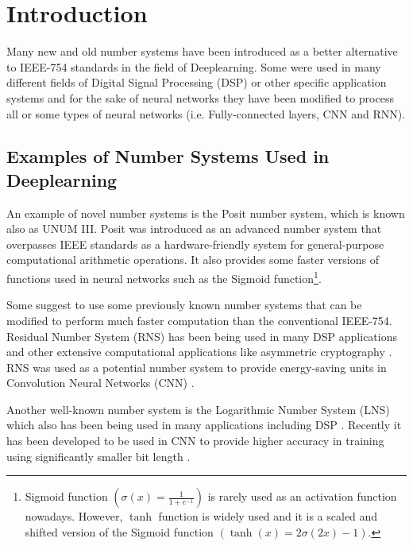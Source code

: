 \section{Introduction}

Many new and old number systems have been introduced as a better alternative to IEEE-754 standards \cite{754} in the field of Deeplearning. Some were used in many different fields of Digital Signal Processing (DSP) or other specific application systems and for the sake of neural networks they have been modified to process all or some types of neural networks (i.e. Fully-connected layers, CNN and RNN).

\subsection{Examples of Number Systems Used in Deeplearning}

An example of novel number systems is the Posit number system\cite{Gustafson2017}, which is known also as UNUM III. Posit was introduced as an advanced number system that overpasses IEEE standards as a hardware-friendly system for general-purpose computational arithmetic operations. It also provides some faster versions of functions used in neural networks such as the Sigmoid function\footnote{Sigmoid function $\left(\sigma(x) = \frac{1}{1 + e^{-1}}\right)$ is rarely used as an activation function nowadays. However, $\tanh$ function is widely used and it is a scaled and shifted version of the Sigmoid function $\left(\tanh(x) = 2 \sigma(2x) -1\right)$.}.

Some suggest to use some previously known number systems that can be modified to perform much faster computation than the conventional IEEE-754. Residual Number System (RNS) \cite{Garner1959} has been being used in many DSP applications\cite{Cardarilli2007,Chaves2003,Claudio1995,DiClaudio1990,Jullien1987} and other extensive computational applications like asymmetric cryptography \cite{Hizzani2019,Asif2018a,Schinianakis2014,Antao2014}. RNS was used as a potential number system to provide energy-saving units in Convolution Neural Networks (CNN) \cite{Samimi2020}.

Another well-known number system is the Logarithmic Number System (LNS) \cite{Kingsbury1971,Alexopoulos1975,Lee1977} which also has been being used in many applications including DSP \cite{Dimitrov2001,Lewis1995}. Recently it has been developed to be used in CNN to provide higher accuracy in training using significantly smaller bit length \cite{Miyashita2016,Juang2019}.

